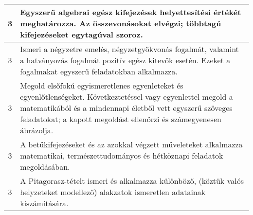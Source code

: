 \begin{longtable}{c | p{} }
                                
                                          3 &  Egyszerű algebrai egész kifejezések helyettesítési értékét meghatározza. Az összevonásokat elvégzi; többtagú kifejezéseket egytagúval szoroz. \\ \hline
                                          3 &  Ismeri a négyzetre emelés, négyzetgyökvonás fogalmát, valamint a hatványozás fogalmát pozitív egész kitevők esetén. Ezeket a fogalmakat egyszerű feladatokban alkalmazza. \\ \hline
                                          3 &  Megold elsőfokú egyismeretlenes egyenleteket és egyenlőtlenségeket. Következtetéssel vagy egyenlettel megold a matematikából és a mindennapi életből vett egyszerű szöveges feladatokat; a kapott megoldást ellenőrzi és számegyenesen ábrázolja. \\ \hline
                                          3 &  A betűkifejezéseket és az azokkal végzett műveleteket alkalmazza matematikai, természettudományos és hétköznapi feladatok megoldásában. \\ \hline
                                          3 &  A Pitagorasz-tételt ismeri és alkalmazza különböző, (köztük valós helyzeteket modellező) alakzatok ismeretlen adatainak kiszámítására. \\ \hline
                                      

\end{longtable}
